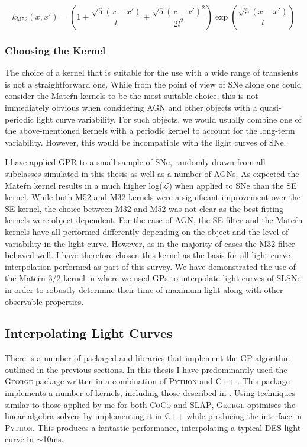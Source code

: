 \begin{equation} \label{eq:M52}
  k_{\textrm{M52}}(x,x') = \left(1 + \frac{\sqrt{5}(x - x')}{l} + \frac{\sqrt{5}(x - x')^2}{2l^2}\right) \exp \left( \frac{\sqrt{5}(x - x')}{l} \right)
\end{equation}

\subsubsection{Choosing the Kernel}
The choice of a kernel that is suitable for the use with a wide range of transients is not a straightforward one. While from the point of view of SNe alone one could consider the Mate\'rn kernels to be the most suitable choice, this is not immediately obvious when considering AGN and other objects with a quasi-periodic light curve variability. For such objects, we would usually combine one of the above-mentioned kernels with a periodic kernel to account for the long-term variability. However, this would be incompatible with the light curves of SNe.

I have applied GPR to a small sample of SNe, randomly drawn from all subclasses simulated in this thesis as well as a number of AGNs. As expected the Mate\'rn kernel results in a much higher log($\mathcal{L}$) when applied to SNe than the SE kernel. While both M52 and M32 kernels were a significant improvement over the SE kernel, the choice between M32 and M52 was not clear as the best fitting kernels were object-dependent. For the case of AGN, the SE filter and the Mate\'rn kernels have all performed differently depending on the object and the level of variability in the light curve. However, as in the majority of cases the M32 filter behaved well. I have therefore chosen this kernel as the basis for all light curve interpolation performed as part of this survey. We have demonstrated the use of the Mate\'rn 3/2 kernel in \citet{Inserra2018} where we used GPs to interpolate light curves of SLSNe in order to robustly determine their time of maximum light along with other observable properties.

\subsection{Interpolating Light Curves}
There is a number of packaged and libraries that implement the GP algorithm outlined in the previous sections. In this thesis I have predominantly used the \textsc{George} package written in a combination of \textsc{Python} and \textsc{C++} \citep{Ambikasaran2014}. This package implements a number of kernels, including those described in . Using techniques similar to those applied by me for both \textsc{CoCo} and \textsc{SLAP}, \textsc{George} optimises the linear algebra solvers by implementing it in \textsc{C++} while producing the interface in \textsc{Python}. This produces a fantastic performance, interpolating a typical DES light curve in $\sim$10ms.

